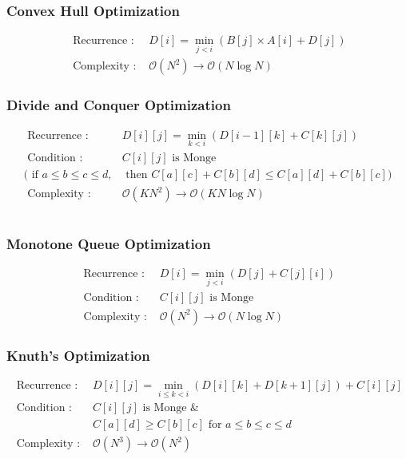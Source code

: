 \documentclass[landscape, 8pt, a4paper, oneside]{extarticle}
\begin{document}
\begin{multicols}{3}
\subsubsection{Convex Hull Optimization}
\begin{align*}
    \text{ Recurrence : }& D[i] = \min_{j<i} { \left(B[j] \times A[i] + D[j] \right)}\\
    \text{ Complexity : }& \mathcal O(N^2) \rightarrow \mathcal O(N\log N)
\end{align*}

\subsubsection{Divide and Conquer Optimization}
\begin{align*}
    \text{ Recurrence : }& D[i][j] = \min_{k<i} { \left(D[i-1][k] + C[k][j]\right)}\\
    \text{ Condition : }& C[i][j] \text{ is Monge } \\
    (\text{ if }a \leqslant b \leqslant c \leqslant d, &\text{ then } C[a][c] + C[b][d] \leqslant C[a][d] + C[b][c] )\\
    \text{ Complexity : }& \mathcal O(KN^2) \rightarrow \mathcal O(KN\log N)
\end{align*}

\inputminted[]{cpp}{source/DP/DnC.cpp}

\subsubsection{Monotone Queue Optimization}
\begin{align*}
    \text{ Recurrence : }& D[i] = \min_{j<i} { \left(D[j] + C[j][i]\right)}\\
    \text{ Condition : }& C[i][j] \text{ is Monge } \\
    \text{ Complexity : }& \mathcal O(N^2) \rightarrow \mathcal O(N\log N)
\end{align*}

\subsubsection{Knuth's Optimization}
\begin{align*}
    \text{ Recurrence : }& D[i][j] = \min_{i\leqslant k < i} { \left(D[i][k] + D[k+1][j] \right) + C[i][j] } \\
    \text{ Condition : }& C[i][j] \text{ is Monge } \& \\ & C[a][d] \geqslant C[b][c] \text{ for } a \leqslant b \leqslant c \leqslant d \\
    \text{ Complexity : }& \mathcal O(N^3) \rightarrow \mathcal O(N^2)
\end{align*}


\end{multicols}
\end{document}
